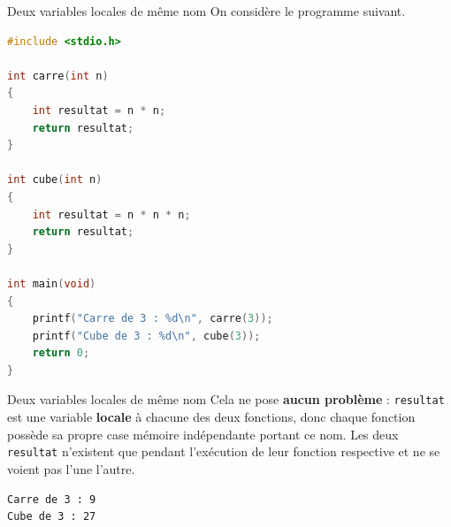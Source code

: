 \begin{UPSTIexercice}{Deux variables locales de même nom}
    On considère le programme suivant.
    \begin{lstlisting}[language=C]
#include <stdio.h>

int carre(int n)
{
    int resultat = n * n;
    return resultat;
}

int cube(int n)
{
    int resultat = n * n * n;
    return resultat;
}

int main(void)
{
    printf("Carre de 3 : %d\n", carre(3));
    printf("Cube de 3 : %d\n", cube(3));
    return 0;
}
    \end{lstlisting}
\end{UPSTIexercice}

\begin{UPSTIprofOnlyEnv}
    \begin{UPSTIcorrectionP}{Deux variables locales de même nom}
        Cela ne pose \textbf{aucun problème} : \texttt{resultat} est une variable \textbf{locale} à chacune des deux fonctions, donc chaque fonction possède sa propre case mémoire indépendante portant ce nom. Les deux \texttt{resultat} n'existent que pendant l'exécution de leur fonction respective et ne se voient pas l'une l'autre.
        \begin{lstlisting}[language=bash,style=console]
Carre de 3 : 9
Cube de 3 : 27
        \end{lstlisting}
    \end{UPSTIcorrectionP}
\end{UPSTIprofOnlyEnv}



